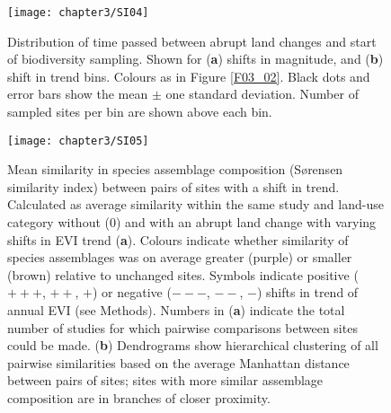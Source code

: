 \begin{figure}[htb]
\centering
\texttt{[image: chapter3/SI04]}
\caption{ Distribution of time passed between abrupt land changes and start of biodiversity sampling. Shown for (\textbf{a}) shifts in magnitude, and (\textbf{b}) shift in trend bins. Colours as in Figure \ref{F03_02}. Black dots and error bars show the mean $\pm$ one standard deviation. Number of sampled sites per bin are shown above each bin.}
\label{SI03_04}
\end{figure}

\begin{figure}[htb]
\centering
\texttt{[image: chapter3/SI05]}
\caption{ Mean similarity in species assemblage composition (S\o rensen similarity index) between pairs of sites with a shift in trend. Calculated as average similarity within the same study and land-use category without ($0$) and with an abrupt land change with varying shifts in EVI trend (\textbf{a}). Colours indicate whether similarity of species assemblages was on average greater (purple) or smaller (brown) relative to unchanged sites. Symbols indicate positive ($+++$, $++$, $+$) or negative ($---$, $--$, $-$) shifts in trend of annual EVI (see Methods). Numbers in (\textbf{a}) indicate the total number of studies for which pairwise comparisons between sites could be made. (\textbf{b}) Dendrograms show hierarchical clustering of all pairwise similarities based on the average Manhattan distance between pairs of sites; sites with more similar assemblage composition are in branches of closer proximity. }
\label{SI03_05}
\end{figure}

\clearpage
